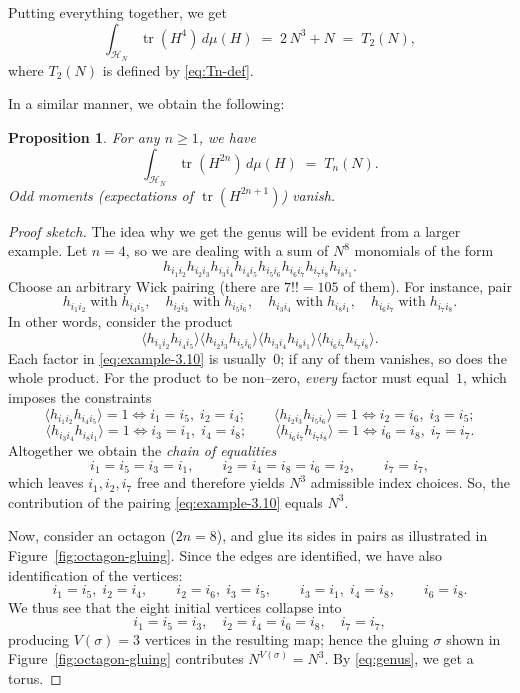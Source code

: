 \documentclass[letterpaper,11pt,oneside,reqno]{article}
\numberwithin{equation}{section}
\newtheorem{proposition}{Proposition}[section]
\theoremstyle{definition}
\begin{document}
Putting everything together, we get
\[
  \int_{\mathcal{H}_N}\!\operatorname{tr}(H^4)\,d\mu(H)
  \;=\;
  2\,N^3 + N
  \;=\;
	T_2(N),
\]
where $T_2(N)$ is defined by \eqref{eq:Tn-def}.

In a similar manner, we obtain the following:
\begin{proposition}
	\label{prop:traces-moments}
	For any $n\ge 1$, we have
	\[
		\int_{\mathcal{H}_N}\!\operatorname{tr}(H^{2n})\,d\mu(H)
		\;=\;
		T_n(N).
	\]
	Odd moments (expectations of $\operatorname{tr}(H^{2n+1})$) vanish.
\end{proposition}
\begin{proof}[Proof sketch]
	The idea why we get the genus will be evident from a larger example.
	Let $n=4$, so we are dealing with a sum of $N^{8}$ monomials of the form
\[
  h_{i_{1}i_{2}}
  h_{i_{2}i_{3}}
  h_{i_{3}i_{4}}
  h_{i_{4}i_{5}}
  h_{i_{5}i_{6}}
  h_{i_{6}i_{7}}
  h_{i_{7}i_{8}}
  h_{i_{8}i_{1}}.
\]
Choose an arbitrary Wick pairing (there are $7!!=105$ of them).
For instance, pair
\[
  h_{i_{1}i_{2}}\;\text{with}\;h_{i_{4}i_{5}},\quad
  h_{i_{2}i_{3}}\;\text{with}\;h_{i_{5}i_{6}},\quad
  h_{i_{3}i_{4}}\;\text{with}\;h_{i_{8}i_{1}},\quad
  h_{i_{6}i_{7}}\;\text{with}\;h_{i_{7}i_{8}}.
\]
In other words, consider the product
\begin{equation}
  \bigl\langle h_{i_{1}i_{2}}h_{i_{4}i_{5}}\bigr\rangle
  \bigl\langle h_{i_{2}i_{3}}h_{i_{5}i_{6}}\bigr\rangle
  \bigl\langle h_{i_{3}i_{4}}h_{i_{8}i_{1}}\bigr\rangle
  \bigl\langle h_{i_{6}i_{7}}h_{i_{7}i_{8}}\bigr\rangle.
  \label{eq:example-3.10}
\end{equation}
Each factor in
\eqref{eq:example-3.10} is usually~$0$; if any of them vanishes, so does
the whole product.  For the product to be non–zero, \emph{every} factor
must equal~$1$, which imposes the constraints
\[
  \langle h_{i_{1}i_{2}}h_{i_{4}i_{5}}\rangle = 1
  \iff
  i_{1}=i_{5},\; i_{2}=i_{4};
\qquad
  \langle h_{i_{2}i_{3}}h_{i_{5}i_{6}}\rangle = 1
  \iff
  i_{2}=i_{6},\; i_{3}=i_{5};
\]
\[
  \langle h_{i_{3}i_{4}}h_{i_{8}i_{1}}\rangle = 1
  \iff
  i_{3}=i_{1},\; i_{4}=i_{8};
\qquad
  \langle h_{i_{6}i_{7}}h_{i_{7}i_{8}}\rangle = 1
  \iff
  i_{6}=i_{8},\; i_{7}=i_{7}.
\]
Altogether we obtain the \emph{chain of equalities}
\[
  i_{1}=i_{5}=i_{3}=i_{1},\qquad
  i_{2}=i_{4}=i_{8}=i_{6}=i_{2},\qquad
  i_{7}=i_{7},
\]
which leaves $i_{1},i_{2},i_{7}$ free and therefore yields $N^{3}$
admissible index choices.  So, the contribution of the pairing
\eqref{eq:example-3.10} equals $N^{3}$.

\medskip
Now,
consider an octagon ($2n=8$), and glue its sides in pairs as illustrated in
Figure~\ref{fig:octagon-gluing}.  Since the edges are identified, we
have also identification of the vertices:
\[
  i_{1}=i_{5},\; i_{2}=i_{4},\qquad
  i_{2}=i_{6},\; i_{3}=i_{5},\qquad
  i_{3}=i_{1},\; i_{4}=i_{8},\qquad
	i_{6}=i_{8}.
\]
We thus see that the eight initial vertices collapse into
\[
  i_{1}=i_{5}=i_{3},\quad
  i_{2}=i_{4}=i_{6}=i_{8},\quad
  i_{7}=i_{7},
\]
producing $V(\sigma)=3$ vertices in the resulting map; hence the gluing
$\sigma$ shown in Figure~\ref{fig:octagon-gluing} contributes
$N^{V(\sigma)} = N^{3}$.
By \eqref{eq:genus}, we get a torus.
\end{proof}
\end{document}
